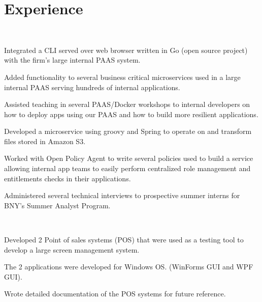 \documentclass[]{hieudo-build}
\begin{document}
\begin{minipage}[t]{0.65\textwidth} 

\section{Experience}

\\
\vspace{0.9em} %
\begin{tightemize}
\item Integrated a CLI served over web browser written in Go (open source project) with the firm's large internal PAAS system. 
\item Added functionality to several business critical microservices used in a large internal PAAS serving hundreds of internal applications.  
\item Assisted teaching in several PAAS/Docker workshops to internal developers on how to deploy apps using our PAAS and how to build more resilient applications.
\item Developed a microservice using groovy and Spring to operate on and transform files stored in Amazon S3.
\item Worked with Open Policy Agent to write several policies used to build a service allowing internal app teams to easily perform centralized role management and entitlements checks in their applications. 
\item Administered several technical interviews to prospective summer interns for BNY's Summer Analyst Program.
\end{tightemize}
\sectionsep

\\
\vspace{0.9em} %
\begin{tightemize}
\item Developed 2 Point of sales systems (POS) that were used as a testing tool to develop a large screen management system.
\item The 2 applications were developed for Windows OS. (WinForms GUI and WPF GUI).  
\item Wrote detailed documentation of the POS systems for future reference. 
\end{tightemize}
\sectionsep


\end{minipage}
\end{document}
